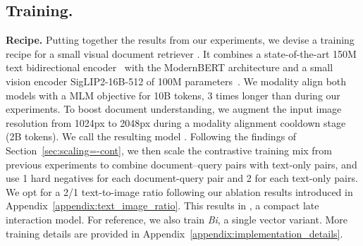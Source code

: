

\subsection{Training.} 

\noindent\textbf{Recipe.} Putting together the results from our experiments, we devise a training recipe for a small visual document retriever \flagship{}. It combines a state-of-the-art 150M text bidirectional encoder~ with the ModernBERT architecture  and a small vision encoder SigLIP2-16B-512 of 100M parameters~. We modality align both models with a MLM objective for 10B tokens, 3 times longer than during our experiments. To boost document understanding, we augment the input image resolution from 1024px to 2048px during a modality alignment cooldown stage (2B tokens). We call the resulting model \flagship{}.
Following the findings of Section~\ref{sec:scaling=-cont}, we then scale the contrastive training mix from previous experiments to combine document–query pairs with text-only pairs, and use 1 hard negatives for each document-query pair and 2 for each text-only pairs. We opt for a 2/1 text-to-image ratio following our ablation results introduced in Appendix~\ref{appendix:text_image_ratio}. This results in \colflagship{}, a compact late interaction model. For reference, we also train \textit{Bi}\flagship{}, a single vector variant. More training details are provided in Appendix~\ref{appendix:implementation_details}.

